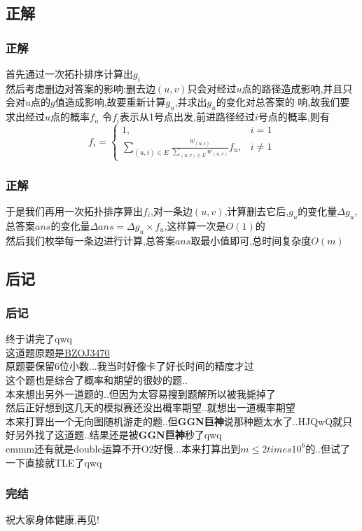 \documentclass{beamer}
\begin{document}
		\subsection{正解}
			\begin{frame}\frametitle{正解}
				首先通过一次拓扑排序计算出$g_i$\\
				然后考虑删边对答案的影响:删去边$(u,v)$只会对经过$u$点的路径造成影响,并且只会对$u$点的$g$值造成影响,故要重新计算$g_u$,并求出$g_u$的变化对总答案的
				响,故我们要求出经过$u$点的概率$f_u$
				令$f_i$表示从1号点出发,前进路径经过$i$号点的概率,则有\\
				$$f_i=\begin{cases}
					1,&i=1\\
					\sum\limits_{(u,i)\in E}\frac{w_{(u,i)}}{\sum\limits_{(u,v)\in E}w_{(u,v)}}f_u,&i\neq1
				\end{cases}$$
			\end{frame}
			\begin{frame}\frametitle{正解}
				于是我们再用一次拓扑排序算出$f_i$,对一条边$(u,v)$,计算删去它后,$g_u$的变化量$\Delta g_u$,总答案$ans$的变化量$\Delta ans=\Delta g_u\times f_u$,这样算一次是$O(1)$的\\
				然后我们枚举每一条边进行计算,总答案$ans$取最小值即可,总时间复杂度$O(m)$
			\end{frame}
		\subsection{后记}
			\begin{frame}\frametitle{后记}
				终于讲完了qwq\\
				这道题原题是\underline{\href{https://darkbzoj.tk/problem/3470}{BZOJ3470}}\\
				原题要保留6位小数...我当时好像卡了好长时间的精度才过\\
				这个题也是综合了概率和期望的很妙的题..\\
				本来想出另外一道题的..但因为太容易搜到题解所以被我毙掉了\\
				然后正好想到这几天的模拟赛还没出概率期望..就想出一道概率期望\\
				本来打算出一个无向图随机游走的题..但\textbf{GGN巨神}说那种题太水了..HJQwQ就只好另外找了这道题..结果还是被\textbf{GGN巨神}秒了qwq\\
				emmm还有就是double运算不开O2好慢...本来打算出到$m\le2times10^6$的..但试了一下直接就TLE了qwq
			\end{frame}
			\begin{frame}\frametitle{完结}
				祝大家身体健康,再见!
			\end{frame}
\end{document}
